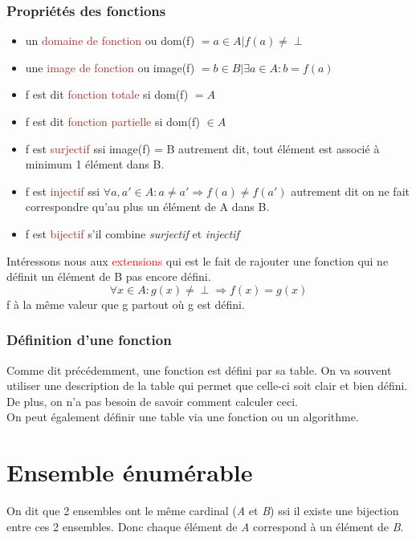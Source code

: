 \documentclass{report}
\begin{document}
\subsubsection{Propriétés des fonctions}
\begin{itemize}
\item un \textcolor{brown}{domaine de fonction} ou dom(f) $= {a \in A | f(a) \neq \perp}$
\item une \textcolor{brown}{image de fonction} ou image(f) $= b \in B | \exists a \in A: b = f(a)$
\item f est dit \textcolor{brown}{fonction totale} si dom(f) $= A$
\item f est dit \textcolor{brown}{fonction partielle} si dom(f) $\in A$ %
\item f est \textcolor{brown}{surjectif} ssi image(f) = B autrement dit, tout élément est associé à minimum 1 élément dans B.
\item f est \textcolor{brown}{injectif} ssi $\forall a, a' \in A: a \neq a' \Rightarrow f(a)\neq f(a')$ autrement dit on ne fait correspondre qu'au plus un élément de A dans B.
\item f est \textcolor{brown}{bijectif} s'il combine \textit{surjectif} et \textit{injectif}
\end{itemize}

Intéressons nous aux \textcolor{red}{extensions} qui est le fait de rajouter une fonction qui ne définit un élément de B pas encore défini.
\begin{equation}
\forall x \in A : g(x) \neq \perp \Rightarrow f(x) = g(x)
\end{equation}	
f à la même valeur que g partout où g est défini.

\subsubsection{Définition d'une fonction}
Comme dit précédemment, une fonction est défini par sa table. On va souvent utiliser une description de la table qui permet que celle-ci soit clair et bien défini. De plus, on n'a pas besoin de savoir comment calculer ceci.\\
On peut également définir une table via une fonction ou un algorithme.

\section{Ensemble énumérable}
On dit que 2 ensembles ont le même cardinal (\textit{A} et \textit{B}) ssi il existe une bijection entre ces 2 ensembles. Donc chaque élément de \textit{A} correspond à un élément de \textit{B}.\\
\end{document}

